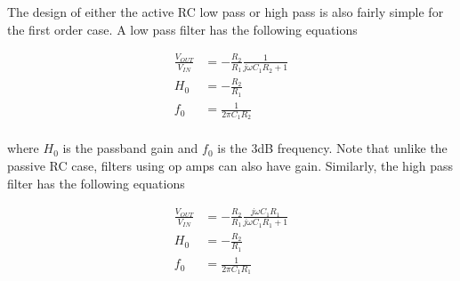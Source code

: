The design of either the active RC low pass or high pass is also fairly simple for the first order case. A low pass filter has the following equations

\begin{align*}
	\frac{V_{OUT}}{V_{IN}} &= -\frac{R_2}{R_1}\frac{1}{j\omega C_1 R_2 +1} \\
	H_0 &= -\frac{R_2}{R_1} \\
	f_0 &= \frac{1}{2 \pi C_1 R_2} \\
\end{align*}

\noindent where $H_0$ is the passband gain and $f_0$ is the 3dB frequency. Note that unlike the passive RC case, filters using op amps can also have gain. Similarly, the high pass filter has the following equations

\begin{align*}
	\frac{V_{OUT}}{V_{IN}} &= -\frac{R_2}{R_1}\frac{j\omega C_1 R_1}{j\omega C_1 R_1 +1}\\ 
	H_0 &= -\frac{R_2}{R_1}\\
	f_0 &= \frac{1}{2 \pi C_1 R_1}\\
\end{align*}


